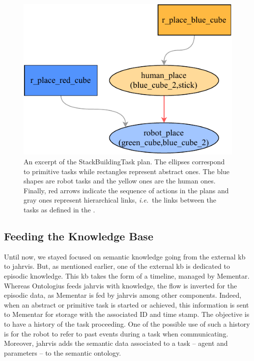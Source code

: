 \documentclass[a4paper,11pt,twoside]{StyleThese}
\begin{document}
\begin{figure}[!ht]
	\centering
	\includegraphics[width=0.5\linewidth]{figures/chapter2/excerpt_plan.pdf}
	\caption{An excerpt of the StackBuildingTask plan. The ellipses correspond to primitive tasks while rectangles represent abstract ones. The blue shapes are robot tasks and the yellow ones are the human ones. Finally, red arrows indicate the sequence of actions in the plans and gray ones represent hierarchical links, \textit{i.e.}~the links between the tasks as defined in the .}
	\label{chap6:fig:excerpt_plan}
\end{figure}

\subsection{Feeding the Knowledge Base}\label{chap6:subsec:feeding}
Until now, we stayed focused on semantic knowledge going from the external \acrshort{kb} to \acrshort{jahrvis}. But, as mentioned earlier, one of the external \acrshort{kb} is dedicated to episodic knowledge. This \acrshort{kb} takes the form of a timeline, managed by Mementar. Whereas Ontologius feeds \acrshort{jahrvis} with knowledge, the flow is inverted for the episodic data, as Mementar is fed by \acrshort{jahrvis} among other components. Indeed, when an abstract or primitive task is started or achieved, this information is sent to Mementar for storage with the associated ID and time stamp. The objective is to have a history of the task proceeding. One of the possible use of such a history is for the robot to refer to past events during a task when communicating.
Moreover, \acrshort{jahrvis} adds the semantic data associated to a task -- agent and parameters -- to the semantic ontology. 


\end{document}
